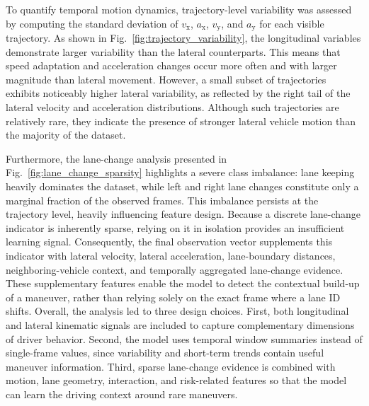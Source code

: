 \documentclass[upint,subscriptcorrection,varvw,hyphenate,balance,greek,russian,vietnamese,german]{asmeconf} %
\begin{document}
To quantify temporal motion dynamics, trajectory-level variability was assessed by computing the standard deviation 
 of $v_\mathrm{x}$, $a_\mathrm{x}$, $v_\mathrm{y}$, and $a_\mathrm{y}$ for each visible trajectory. As shown in Fig.~\ref{fig:trajectory_variability}, the longitudinal variables demonstrate larger variability than the lateral counterparts. 
This means that speed adaptation and acceleration changes occur more often and with larger magnitude than lateral movement. 
However, a small subset of trajectories exhibits noticeably higher lateral variability, as reflected by the right tail of the lateral velocity and acceleration distributions. 
Although such trajectories are relatively rare, they indicate the presence of stronger lateral vehicle motion than the majority of the dataset.

Furthermore, the lane-change analysis presented in Fig.~\ref{fig:lane_change_sparsity} highlights a severe class 
imbalance: lane keeping heavily dominates the dataset, while left and right lane changes constitute only a 
marginal fraction of the observed frames. This imbalance persists at the trajectory level, heavily influencing feature design. 
Because a discrete lane-change indicator is inherently sparse, relying on it in isolation provides an insufficient learning signal. 
Consequently, the final observation vector supplements this indicator with lateral velocity, lateral acceleration, lane-boundary 
distances, neighboring-vehicle context, and temporally aggregated lane-change evidence. These supplementary features enable 
the model to detect the contextual build-up of a maneuver, rather than relying solely on the exact frame where a lane ID shifts.
Overall, the analysis led to three design choices. 
First, both longitudinal and lateral kinematic signals are included to capture complementary dimensions of driver behavior. 
Second, the model uses temporal window summaries instead of single-frame values, since variability and short-term trends contain useful maneuver information. 
Third, sparse lane-change evidence is combined with motion, lane geometry, interaction, and risk-related features so that the model can learn the driving context around rare maneuvers.
\end{document}
